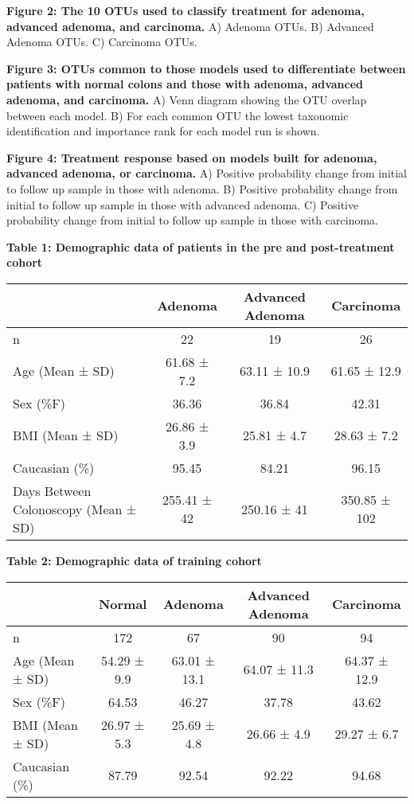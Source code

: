 \documentclass[12pt,]{article}
\begin{document}
\textbf{Figure 2: The 10 OTUs used to classify treatment for adenoma,
advanced adenoma, and carcinoma.} A) Adenoma OTUs. B) Advanced Adenoma
OTUs. C) Carcinoma OTUs.

\textbf{Figure 3: OTUs common to those models used to differentiate
between patients with normal colons and those with adenoma, advanced
adenoma, and carcinoma.} A) Venn diagram showing the OTU overlap between
each model. B) For each common OTU the lowest taxonomic identification
and importance rank for each model run is shown.

\textbf{Figure 4: Treatment response based on models built for adenoma,
advanced adenoma, or carcinoma.} A) Positive probability change from
initial to follow up sample in those with adenoma. B) Positive
probability change from initial to follow up sample in those with
advanced adenoma. C) Positive probability change from initial to follow
up sample in those with carcinoma.

\newpage

\textbf{Table 1: Demographic data of patients in the pre and
post-treatment cohort}

\begin{longtable}[]{@{}lccc@{}}
\toprule
& Adenoma & Advanced Adenoma & Carcinoma\tabularnewline
\midrule
\endhead
n & 22 & 19 & 26\tabularnewline
Age (Mean ± SD) & 61.68 ± 7.2 & 63.11 ± 10.9 & 61.65 ±
12.9\tabularnewline
Sex (\%F) & 36.36 & 36.84 & 42.31\tabularnewline
BMI (Mean ± SD) & 26.86 ± 3.9 & 25.81 ± 4.7 & 28.63 ± 7.2\tabularnewline
Caucasian (\%) & 95.45 & 84.21 & 96.15\tabularnewline
Days Between Colonoscopy (Mean ± SD) & 255.41 ± 42 & 250.16 ± 41 &
350.85 ± 102\tabularnewline
\bottomrule
\end{longtable}

\newpage

\textbf{Table 2: Demographic data of training cohort}

\begin{longtable}[]{@{}lcccc@{}}
\toprule
& Normal & Adenoma & Advanced Adenoma & Carcinoma\tabularnewline
\midrule
\endhead
n & 172 & 67 & 90 & 94\tabularnewline
Age (Mean ± SD) & 54.29 ± 9.9 & 63.01 ± 13.1 & 64.07 ± 11.3 & 64.37 ±
12.9\tabularnewline
Sex (\%F) & 64.53 & 46.27 & 37.78 & 43.62\tabularnewline
BMI (Mean ± SD) & 26.97 ± 5.3 & 25.69 ± 4.8 & 26.66 ± 4.9 & 29.27 ±
6.7\tabularnewline
Caucasian (\%) & 87.79 & 92.54 & 92.22 & 94.68\tabularnewline
\bottomrule
\end{longtable}

\newpage
\end{document}
